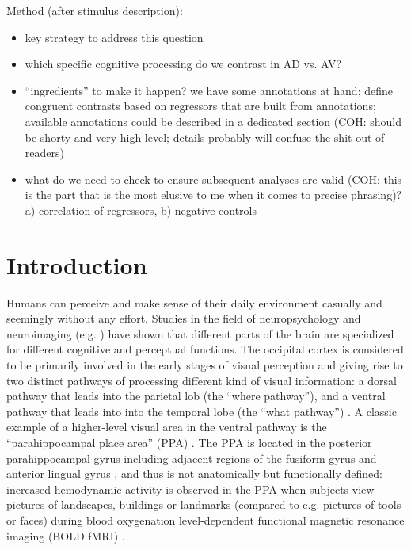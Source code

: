 \documentclass[english]{article}
\begin{document}
\noindent Method (after stimulus description):

\begin{itemize}
\item key strategy to address this question
\item which specific cognitive processing do we contrast in AD vs. AV?
\item ``ingredients'' to make it happen? we have some annotations at hand;
    define congruent contrasts based on regressors that are built from
    annotations; available annotations could be described in a dedicated
    section (COH: should be shorty and very high-level; details probably will
    confuse the shit out of readers)
\item what do we need to check to ensure subsequent analyses are valid (COH:
    this is the part that is the most elusive to me when it comes to precise
    phrasing)? a) correlation of regressors, b) negative controls
\end{itemize}


\pagebreak[4]


\section{Introduction}


Humans can perceive and make sense of their daily environment casually and
seemingly without any effort.
%
Studies in the field of neuropsychology and neuroimaging (e.g.
\citep{penfield1950cerebral, fox1984noninvasive}) have shown that different
parts of the brain are specialized for different cognitive and perceptual
functions.
The occipital cortex is considered to be primarily involved in the early stages
of visual perception and giving rise to two distinct pathways of processing
different kind of visual information:
a dorsal pathway that leads into the parietal lob (the ``where pathway''), and a
ventral pathway that leads into into the temporal lobe (the ``what pathway'')
\citep{goodale1992separate, mishkin1982contribution}.
A classic example of a higher-level visual area in the ventral pathway is the
``parahippocampal place area'' (PPA) \citep{epstein1998ppa,
epstein1999parahippocampal}.
The PPA is located in the posterior parahippocampal gyrus including adjacent
regions of the fusiform gyrus and anterior lingual gyrus
\citep{epstein2008parahippocampal}, and thus is not anatomically but
functionally defined:
increased hemodynamic activity is observed in the PPA when subjects view
pictures of landscapes, buildings or landmarks (compared to e.g. pictures of
tools or faces) during blood oxygenation level-dependent functional magnetic
resonance imaging (BOLD fMRI) \citep{aguirre1998area, epstein2014neural,
epstein1998ppa, troiani2012object}.
\end{document}
